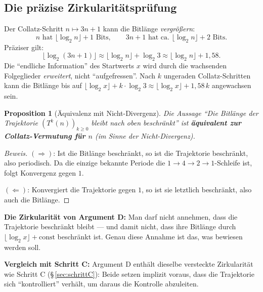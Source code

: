 \documentclass[12pt,a4paper]{article}
\newtheorem{proposition}[definition]{Proposition}
\newenvironment{beweis}{\begin{proof}[Beweis]}{\end{proof}}
\begin{document}
\subsection{Die präzise Zirkularitätsprüfung}
\label{sec:binaer:zirkel}

\begin{tcolorbox}[lücke, title={Das zentrale Problem: Bitlänge wächst mit der Trajektorie}]
Der Collatz-Schritt $n \mapsto 3n+1$ kann die Bitlänge \emph{vergrößern}:
\[
  n \text{ hat } \lfloor\log_2 n\rfloor + 1 \text{ Bits},
  \qquad
  3n+1 \text{ hat ca.\ } \lfloor\log_2 n\rfloor + 2 \text{ Bits.}
\]
Präziser gilt:
\[
  \lfloor\log_2(3n+1)\rfloor \approx \lfloor\log_2 n\rfloor + \log_2 3
  \approx \lfloor\log_2 n\rfloor + 1{,}58.
\]
Die ``endliche Information'' des Startwerts $x$ wird durch die wachsenden
Folgeglieder \emph{erweitert}, nicht ``aufgefressen''. Nach $k$ ungeraden
Collatz-Schritten kann die Bitlänge bis auf
$\lfloor\log_2 x\rfloor + k \cdot \log_2 3 \approx \lfloor\log_2 x\rfloor + 1{,}58\,k$
angewachsen sein.
\end{tcolorbox}

\begin{proposition}[Äquivalenz mit Nicht-Divergenz]
\label{prop:bitlaenge}
Die Aussage ``Die Bitlänge der Trajektorie $(T^k(n))_{k\geq 0}$ bleibt nach
oben beschränkt'' ist \textbf{äquivalent zur Collatz-Vermutung für $n$} (im Sinne
der Nicht-Divergenz).
\end{proposition}

\begin{beweis}
$(\Rightarrow)$: Ist die Bitlänge beschränkt, so ist die Trajektorie beschränkt,
also periodisch. Da die einzige bekannte Periode die $1 \to 4 \to 2 \to 1$-Schleife
ist, folgt Konvergenz gegen $1$.

$(\Leftarrow)$: Konvergiert die Trajektorie gegen $1$, so ist sie letztlich beschränkt,
also auch die Bitlänge.
\end{beweis}

\begin{tcolorbox}[zirkel]
\textbf{Die Zirkularität von Argument D:} Man darf nicht annehmen, dass die
Trajektorie beschränkt bleibt --- und damit nicht, dass ihre Bitlänge durch
$\lfloor\log_2 x\rfloor + \mathrm{const}$ beschränkt ist. Genau diese
Annahme ist das, was bewiesen werden soll.

\medskip
\textbf{Vergleich mit Schritt C:} Argument D enthält dieselbe versteckte
Zirkularität wie Schritt C (\S\,\ref{sec:schrittC}): Beide setzen implizit
voraus, dass die Trajektorie sich ``kontrolliert'' verhält, um daraus die
Kontrolle abzuleiten.
\end{tcolorbox}
\end{document}
